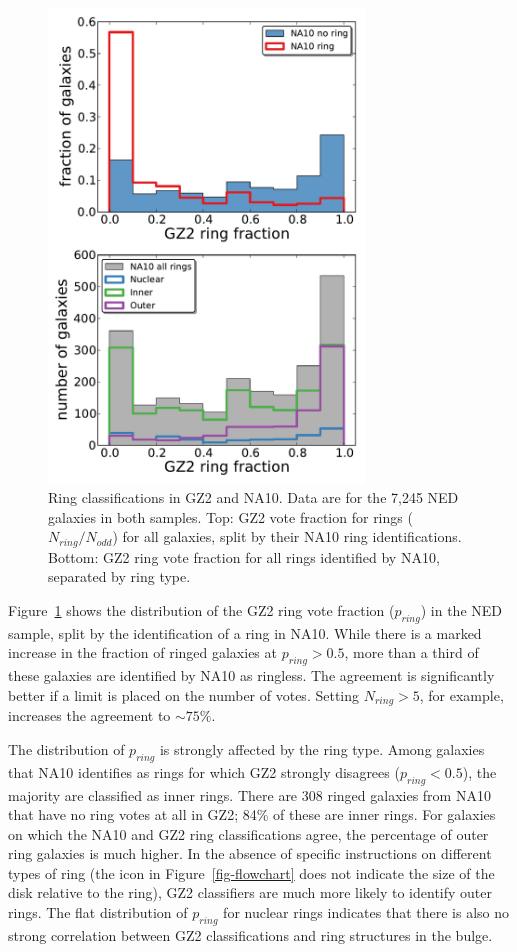 \documentclass[useAMS,usenatbib]{mn2e}
\begin{document}
\begin{figure}
\includegraphics[angle=0,width=3.3in]{figures/na_gz2_rings.pdf}
\caption{Ring classifications in GZ2 and NA10. Data are for the 7,245 NED galaxies in both samples. Top: GZ2 vote fraction for rings ($N_{ring}/N_{odd}$) for all galaxies, split by their NA10 ring identifications. Bottom: GZ2 ring vote fraction for all rings identified by NA10, separated by ring type.
\label{fig-na_rings}}
\end{figure}

Figure~\ref{fig-na_rings} shows the distribution of the GZ2 ring vote fraction ($p_{ring}$) in the NED sample, split by the identification of a ring in NA10. While there is a marked increase in the fraction of ringed galaxies at $p_{ring}>0.5$, more than a third of these galaxies are identified by NA10 as ringless. The agreement is significantly better if a limit is placed on the number of votes. Setting $N_{ring} > 5$, for example, increases the agreement to $\sim75\%$. 

The distribution of $p_{ring}$ is strongly affected by the ring type. Among galaxies that NA10 identifies as rings for which GZ2 strongly disagrees ($p_{ring}<0.5$), the majority are classified as inner rings. There are 308 ringed galaxies from NA10 that have no ring votes at all in GZ2; 84\% of these are inner rings. For galaxies on which the NA10 and GZ2 ring classifications agree, the percentage of outer ring galaxies is much higher. In the absence of specific instructions on different types of ring (the icon in Figure~\ref{fig-flowchart} does not indicate the size of the disk relative to the ring), GZ2 classifiers are much more likely to identify outer rings. The flat distribution of $p_{ring}$ for nuclear rings indicates that there is also no strong correlation between GZ2 classifications and ring structures in the bulge. 
\end{document}
